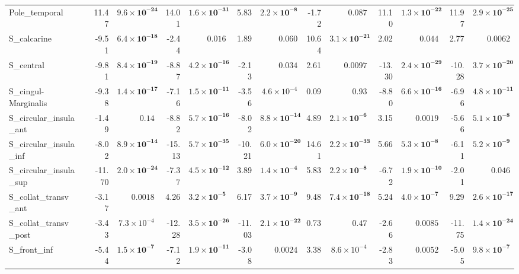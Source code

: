 {\begin{longtable}{llrrrrrrrrrrrr}
Pole\_temporal &  & 11.47 & $\mathbf{9.6{\times}10^{-24}}$ & 14.01 & $\mathbf{1.6{\times}10^{-31}}$ & 5.83 & $\mathbf{2.2{\times}10^{-8}}$ & -1.72 & $0.087$ & 11.10 & $\mathbf{1.3{\times}10^{-22}}$ & 11.97 & $\mathbf{2.9{\times}10^{-25}}$ \\
S\_calcarine &  & -9.51 & $\mathbf{6.4{\times}10^{-18}}$ & -2.44 & $0.016$ & 1.89 & $0.060$ & 10.64 & $\mathbf{3.1{\times}10^{-21}}$ & 2.02 & $0.044$ & 2.77 & $0.0062$ \\
S\_central &  & -9.81 & $\mathbf{8.4{\times}10^{-19}}$ & -8.87 & $\mathbf{4.2{\times}10^{-16}}$ & -2.13 & $0.034$ & 2.61 & $0.0097$ & -13.30 & $\mathbf{2.4{\times}10^{-29}}$ & -10.28 & $\mathbf{3.7{\times}10^{-20}}$ \\
S\_cingul-Marginalis &  & -9.38 & $\mathbf{1.4{\times}10^{-17}}$ & -7.16 & $\mathbf{1.5{\times}10^{-11}}$ & -3.56 & $4.6{\times}10^{-4}$ & 0.09 & $0.93$ & -8.80 & $\mathbf{6.6{\times}10^{-16}}$ & -6.96 & $\mathbf{4.8{\times}10^{-11}}$ \\
S\_circular\_insula\_ant &  & -1.49 & $0.14$ & -8.82 & $\mathbf{5.7{\times}10^{-16}}$ & -8.02 & $\mathbf{8.8{\times}10^{-14}}$ & 4.89 & $\mathbf{2.1{\times}10^{-6}}$ & 3.15 & $0.0019$ & -5.66 & $\mathbf{5.1{\times}10^{-8}}$ \\
S\_circular\_insula\_inf &  & -8.02 & $\mathbf{8.9{\times}10^{-14}}$ & -15.13 & $\mathbf{5.7{\times}10^{-35}}$ & -10.21 & $\mathbf{6.0{\times}10^{-20}}$ & 14.61 & $\mathbf{2.2{\times}10^{-33}}$ & 5.66 & $\mathbf{5.3{\times}10^{-8}}$ & -6.11 & $\mathbf{5.2{\times}10^{-9}}$ \\
S\_circular\_insula\_sup &  & -11.70 & $\mathbf{2.0{\times}10^{-24}}$ & -7.37 & $\mathbf{4.5{\times}10^{-12}}$ & 3.89 & $\mathbf{1.4{\times}10^{-4}}$ & 5.83 & $\mathbf{2.2{\times}10^{-8}}$ & -6.72 & $\mathbf{1.9{\times}10^{-10}}$ & -2.01 & $0.046$ \\
S\_collat\_transv\_ant &  & -3.17 & $0.0018$ & 4.26 & $\mathbf{3.2{\times}10^{-5}}$ & 6.17 & $\mathbf{3.7{\times}10^{-9}}$ & 9.48 & $\mathbf{7.4{\times}10^{-18}}$ & 5.24 & $\mathbf{4.0{\times}10^{-7}}$ & 9.29 & $\mathbf{2.6{\times}10^{-17}}$ \\
S\_collat\_transv\_post &  & -3.43 & $7.3{\times}10^{-4}$ & -12.28 & $\mathbf{3.5{\times}10^{-26}}$ & -11.03 & $\mathbf{2.1{\times}10^{-22}}$ & 0.73 & $0.47$ & -2.66 & $0.0085$ & -11.75 & $\mathbf{1.4{\times}10^{-24}}$ \\
S\_front\_inf &  & -5.44 & $\mathbf{1.5{\times}10^{-7}}$ & -7.12 & $\mathbf{1.9{\times}10^{-11}}$ & -3.08 & $0.0024$ & 3.38 & $8.6{\times}10^{-4}$ & -2.83 & $0.0052$ & -5.05 & $\mathbf{9.8{\times}10^{-7}}$ \\

\end{longtable}}
